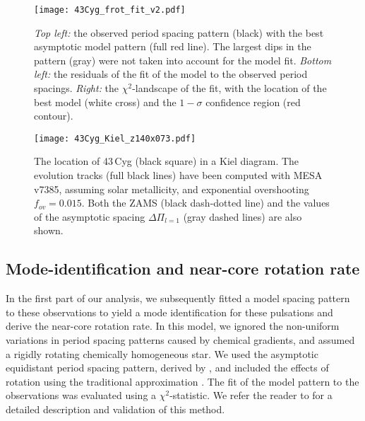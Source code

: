 \documentclass{aa}
\begin{document}
\begin{figure*}[ht]
	\begin{center}
	\texttt{[image: 43Cyg\_frot\_fit\_v2.pdf]}
	\caption{{\em Top left:} the observed period spacing pattern (black) with the best asymptotic model pattern (full red line). The largest dips in the pattern (gray) were not taken into account for the model fit. {\em Bottom left:} the residuals of the fit of the model to the observed period spacings. {\em Right:} the $\chi^2$-landscape of the fit, with the location of the best model (white cross) and the $1-\sigma$ confidence region (red contour).}
	\label{fig:43Cyg_rotfit} 
	\end{center} 
\end{figure*}



\begin{figure*}[ht]
	\begin{center}
	\texttt{[image: 43Cyg\_Kiel\_z140x073.pdf]}
	\caption{The location of 43\,Cyg (black square) in a Kiel diagram. The evolution tracks (full black lines) have been computed with MESA v7385, assuming solar metallicity, and exponential overshooting $f_{ov} = 0.015$. Both the ZAMS (black dash-dotted line) and the values of the asymptotic spacing $\Delta\Pi_{l=1}$ (gray dashed lines) are also shown.} 
	\label{fig:kiel} 
	\end{center} 
\end{figure*}


\subsection{Mode-identification and near-core rotation rate}
\label{mode-id}
In the first part of our analysis, we subsequently fitted a model 
spacing pattern to these observations to yield a mode identification 
for these pulsations and derive the near-core rotation rate. In this 
model, we ignored the non-uniform variations in period spacing patterns 
caused by chemical gradients, and assumed a rigidly rotating chemically 
homogeneous star. We used the asymptotic equidistant period spacing pattern, 
derived by \citet{tassoul1980}, and included the effects of rotation using 
the traditional approximation \citep[e.g.][]{eckart1960,lee1987,lee1997}. 
The fit of the model pattern to the observations was evaluated using a 
$\chi^2$-statistic. We refer the reader to \citet{vanreeth2016} for a 
detailed description and validation of this method.
\end{document}
